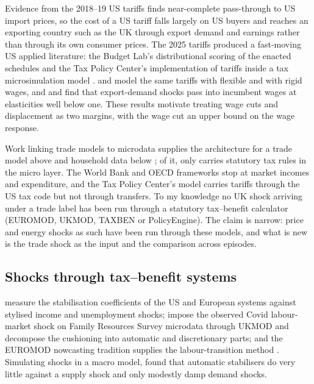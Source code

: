 Evidence from the 2018--19 US tariffs
\citep{amitireddingweinstein2019, fajgelbaumetal2020, cavalloetal2021}
finds near-complete pass-through to US import prices, so the cost of a
US tariff falls largely on US buyers and reaches an exporting country
such as the UK through export demand and earnings rather than through
its own consumer prices. The 2025 tariffs produced a fast-moving US
applied literature: the Budget Lab's distributional scoring of the
enacted schedules and the Tax Policy Center's implementation of tariffs
inside a tax microsimulation model \citep{budgetlab2025, tpc2025}. \citet{ignatenko2025} and
\citet{rodriguezclare2025} model the same tariffs with flexible and
with rigid wages, and \citet{hummels2014} and
\citet{garinsilverio2024} find that export-demand shocks pass into
incumbent wages at elasticities well below one. These results motivate
treating wage cuts and displacement as two margins, with the wage cut
an upper bound on the wage response.

Work linking trade models to microdata supplies the architecture for a
trade model above and household data below
\citep{robilliardrobinson2005, peichl2008, colombo2010, cali2019}; of
it, only \citet{peichl2008} carries statutory tax rules in the micro
layer. The World Bank and OECD frameworks stop at market incomes and
expenditure, and the Tax Policy Center's model carries tariffs through
the US tax code but not through transfers. To my knowledge no UK shock
arriving under a trade label has been run through a statutory
tax--benefit calculator (EUROMOD, UKMOD, TAXBEN or PolicyEngine). The
claim is narrow: price and energy shocks as such have been run through
these models, and what is new is the trade shock as the input and the
comparison across episodes.

\subsection{Shocks through tax--benefit systems}

\citet{dolls2012} measure the stabilisation coefficients of the US and
European systems against stylised income and unemployment shocks;
\citet{brewertasseva2021} impose the observed Covid labour-market
shock on Family Resources Survey microdata through UKMOD and decompose
the cushioning into automatic and discretionary parts; and the EUROMOD
nowcasting tradition supplies the labour-transition method
\citep{navicke2014}. Simulating shocks in a macro model,
\citet{cohenfollette2000} found that automatic stabilisers do very
little against a supply shock and only modestly damp demand shocks.

